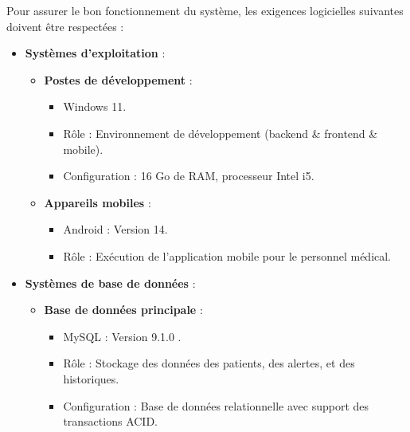 Pour assurer le bon fonctionnement du système, les exigences logicielles suivantes doivent être respectées :

\begin{itemize}
    \item \textbf{Systèmes d'exploitation} :
    \begin{itemize}
        \item \textbf{Postes de développement} :
            \begin{itemize}
                \item Windows 11.
                \item Rôle : Environnement de développement (backend \& frontend \& mobile).
                \item Configuration : 16 Go de RAM, processeur Intel i5.
            \end{itemize}
        \item \textbf{Appareils mobiles} :
            \begin{itemize}
                \item Android : Version 14.
                \item Rôle : Exécution de l'application mobile pour le personnel médical.
            \end{itemize}
    \end{itemize}

    \item \textbf{Systèmes de base de données} :
    \begin{itemize}
        \item \textbf{Base de données principale} :
            \begin{itemize}
                \item MySQL : Version 9.1.0 .
                \item Rôle : Stockage des données des patients, des alertes, et des historiques.
                \item Configuration : Base de données relationnelle avec support des transactions ACID.
            \end{itemize}
    \end{itemize}


\end{itemize}
